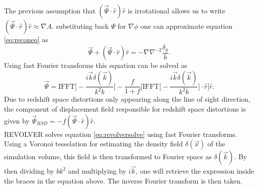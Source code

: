 The previous assumption that $(\vec{\Psi}\cdot\hat{r})\hat{r}$ is irrotational
allows us to write $(\vec{\Psi}\cdot\hat{r})\hat{r}\approx\nabla A$.
substituting back $\Psi$ for $\nabla\phi$ one can approximate equation
\ref{eq:reconeq} as 
\begin{equation}
    \vec{\Psi}+(\vec{\Psi}\cdot\hat{r})\hat{r}=-\nabla\nabla^{-2}\frac{\delta_g}{b}.
\end{equation}
Using fast Fourier transforms this equation can be solved as \cite{Burden_reconstruction}
\begin{equation}\label{eq:revolversolve}
    \vec{\Psi}=\mathrm{IFFT}\Big[-\frac{i\vec{k}\delta(\vec{k})}{k^2b}\Big]-\frac{f}{1+f}\Big[\mathrm{IFFT}\Big[-\frac{i\vec{k}\delta(\vec{k})}{k^2b}\Big]\cdot\hat{r}\Big]\hat{r}.
\end{equation}
Due to redshift space distortions only appearing along the line of sight direction, the component of displacement field responsible for redshift space distortions is given by $\vec{\Psi}_{RSD}=-f(\vec{\Psi}\cdot\hat{r})\hat{r}$.
\\\indent
REVOLVER solves equation \ref{eq:revolversolve} using fast Fourier transforms.
Using a Voronoi tesselation for estimating the density field $\delta(\vec{x})$ of
the simulation volume, this field is then transformed to Fourier space as
$\delta(\vec{k})$. By then dividing by $bk^2$ and multiplying by $i\vec{k}$, one
will retrieve the expression inside the braces in the equation above. The
inverse Fourier transform is then taken.

